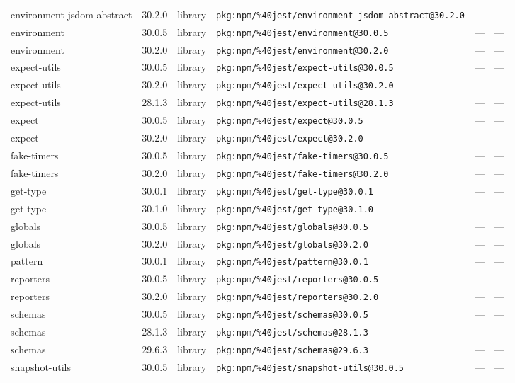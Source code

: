 \documentclass[11pt]{article}
\begin{document}
\begin{longtable}{|l|l|l|p{2.2cm}|l|p{4cm}|}
environment-jsdom-abstract & 30.2.0 & library & \texttt{pkg:npm/\%40jest/environment-jsdom-abstract@30.2.0} & — & — \\
environment & 30.0.5 & library & \texttt{pkg:npm/\%40jest/environment@30.0.5} & — & — \\
environment & 30.2.0 & library & \texttt{pkg:npm/\%40jest/environment@30.2.0} & — & — \\
expect-utils & 30.0.5 & library & \texttt{pkg:npm/\%40jest/expect-utils@30.0.5} & — & — \\
expect-utils & 30.2.0 & library & \texttt{pkg:npm/\%40jest/expect-utils@30.2.0} & — & — \\
expect-utils & 28.1.3 & library & \texttt{pkg:npm/\%40jest/expect-utils@28.1.3} & — & — \\
expect & 30.0.5 & library & \texttt{pkg:npm/\%40jest/expect@30.0.5} & — & — \\
expect & 30.2.0 & library & \texttt{pkg:npm/\%40jest/expect@30.2.0} & — & — \\
fake-timers & 30.0.5 & library & \texttt{pkg:npm/\%40jest/fake-timers@30.0.5} & — & — \\
fake-timers & 30.2.0 & library & \texttt{pkg:npm/\%40jest/fake-timers@30.2.0} & — & — \\
get-type & 30.0.1 & library & \texttt{pkg:npm/\%40jest/get-type@30.0.1} & — & — \\
get-type & 30.1.0 & library & \texttt{pkg:npm/\%40jest/get-type@30.1.0} & — & — \\
globals & 30.0.5 & library & \texttt{pkg:npm/\%40jest/globals@30.0.5} & — & — \\
globals & 30.2.0 & library & \texttt{pkg:npm/\%40jest/globals@30.2.0} & — & — \\
pattern & 30.0.1 & library & \texttt{pkg:npm/\%40jest/pattern@30.0.1} & — & — \\
reporters & 30.0.5 & library & \texttt{pkg:npm/\%40jest/reporters@30.0.5} & — & — \\
reporters & 30.2.0 & library & \texttt{pkg:npm/\%40jest/reporters@30.2.0} & — & — \\
schemas & 30.0.5 & library & \texttt{pkg:npm/\%40jest/schemas@30.0.5} & — & — \\
schemas & 28.1.3 & library & \texttt{pkg:npm/\%40jest/schemas@28.1.3} & — & — \\
schemas & 29.6.3 & library & \texttt{pkg:npm/\%40jest/schemas@29.6.3} & — & — \\
snapshot-utils & 30.0.5 & library & \texttt{pkg:npm/\%40jest/snapshot-utils@30.0.5} & — & — \\

\end{longtable}
\end{document}
